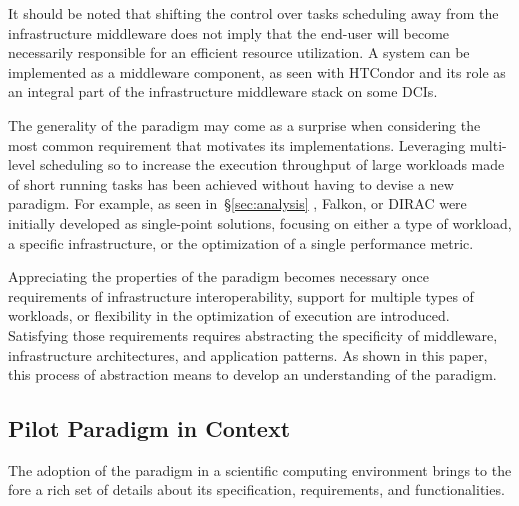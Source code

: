\documentclass{sig-alternate}
\begin{document}
It should be noted that shifting the control over tasks scheduling away from
the infrastructure middleware does not imply that the end-user will become
necessarily responsible for an efficient resource utilization. A \pilot system
can be implemented as a middleware component, as seen with HTCondor and its
role as an integral part of the infrastructure middleware stack on some DCIs.

The generality of the \pilot paradigm may come as a surprise when considering
the most common requirement that motivates its implementations. Leveraging
multi-level scheduling so to increase the execution throughput of large
workloads made of short running tasks has been achieved without having to
devise a new paradigm. For example, as seen in~\S\ref{sec:analysis} \panda,
Falkon, or DIRAC were initially developed as single-point solutions, focusing
on either a type of workload, a specific infrastructure, or the optimization of
a single performance metric.

Appreciating the properties of the \pilot paradigm becomes necessary once
requirements of infrastructure interoperability, support for multiple types of
workloads, or flexibility in the optimization of execution are introduced.
Satisfying those requirements requires abstracting the specificity of
middleware, infrastructure architectures, and application patterns. As shown in
this paper, this process of abstraction means to develop an understanding of
the \pilot paradigm.


%
\subsection{Pilot Paradigm in Context}
\label{sec:context}

The adoption of the \pilot paradigm in a scientific computing environment brings
to the fore a rich set of details about its specification, requirements, and
functionalities. 

\end{document}
